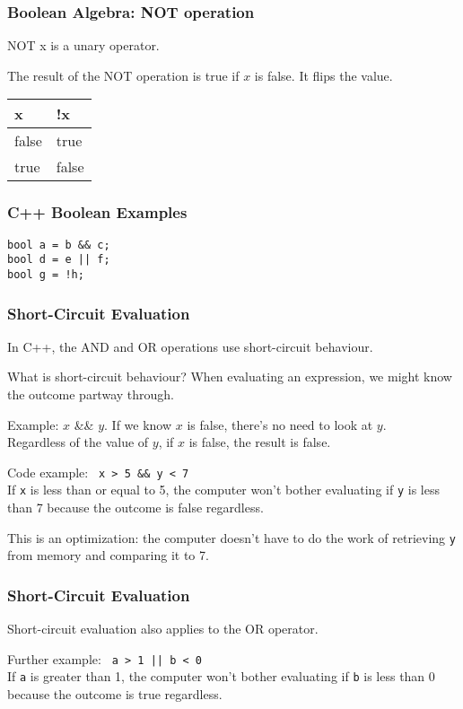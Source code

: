\begin{frame}
\frametitle{Boolean Algebra: NOT operation}

NOT x is a unary operator.

The result of the NOT operation is true if $x$ is false. It flips the value.

\begin{center}
\begin{tabular}{l|l}
	\textbf{x} & \textbf{!x}\\ \hline
	false & true \\ \hline
	true & false \\ 
\end{tabular}
\end{center}

\end{frame}


\begin{frame}
\frametitle{C++ Boolean Examples}


\texttt{bool a = b \&\& c;}\\
\texttt{bool d = e || f;}\\
\texttt{bool g = !h;}

\end{frame}

\begin{frame}
\frametitle{Short-Circuit Evaluation}
In C++, the AND and OR operations use \alert{short-circuit} behaviour.

What is short-circuit behaviour? When evaluating an expression, we might know the outcome partway through.

Example: $x$ \&\& $y$. If we know $x$ is false, there's no need to look at $y$.\\
\quad Regardless of the value of $y$, if $x$ is false, the result is false.

Code example: \texttt{ x > 5 \&\& y < 7 }\\
If \texttt{x} is less than or equal to 5, the computer won't bother evaluating if \texttt{y} is less than 7 because the outcome is false regardless.

This is an optimization: the computer doesn't have to do the work of retrieving \texttt{y} from memory and comparing it to 7.

\end{frame}

\begin{frame}
\frametitle{Short-Circuit Evaluation}

Short-circuit evaluation also applies to the OR operator.

Further example: \texttt{ a > 1 || b < 0 }\\
If \texttt{a} is greater than 1, the computer won't bother evaluating if \texttt{b} is less than 0 because the outcome is true regardless.

\end{frame}

